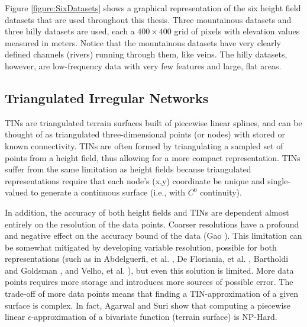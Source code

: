 Figure \ref{figure:SixDatasets} shows a graphical representation of the six height field datasets that are used throughout this thesis. Three mountainous datasets and three hilly datasets are used, each a $400 \times 400$ grid of pixels with elevation values measured in meters. Notice that the mountainous datasets have very clearly defined channels (rivers) running through them, like veins. The hilly datasets, however, are low-frequency data with very few features and large, flat areas. 

\subsection{Triangulated Irregular Networks}

 
TINs are triangulated terrain surfaces built of piecewise linear splines, and can be thought of as triangulated 
three-dimensional points (or nodes) with stored or known connectivity.
TINs are often formed by triangulating a sampled set of points from a height field, thus allowing for a more compact representation.
TINs suffer from the same limitation as height fields because triangulated representations require that each node's (x,y) coordinate be unique and single-valued to generate a continuous surface (i.e., with $C^{0}$ continuity).

In addition, the accuracy of 
both height fields and TINs are dependent almost entirely on the resolution of the data points. Coarser resolutions have a profound and negative effect on the accuracy bound of the data (Gao \cite{gao:resolution}). This limitation can be somewhat mitigated by developing variable resolution, possible for both representations (such as in Abdelguerfi, et al. \cite{Abdelguerfi-HierTINs}, De Floriania, et al. \cite{DeFloriani-HTINs}, Bartholdi and Goldsman \cite{BartholdiAndGoldsman-HierTINs}, and Velho, et al. \cite{Velho-HierTINs}), but even this solution is limited. More data points requires more storage and introduces more sources of possible error. The trade-off of more data points means that finding a TIN-approximation of a given surface is complex. 
In fact, Agarwal and Suri \cite{Agarwal:1994:SAG:314464.314475} show that computing a piecewise linear $\epsilon$-approximation of a bivariate function (terrain surface) is NP-Hard. 

